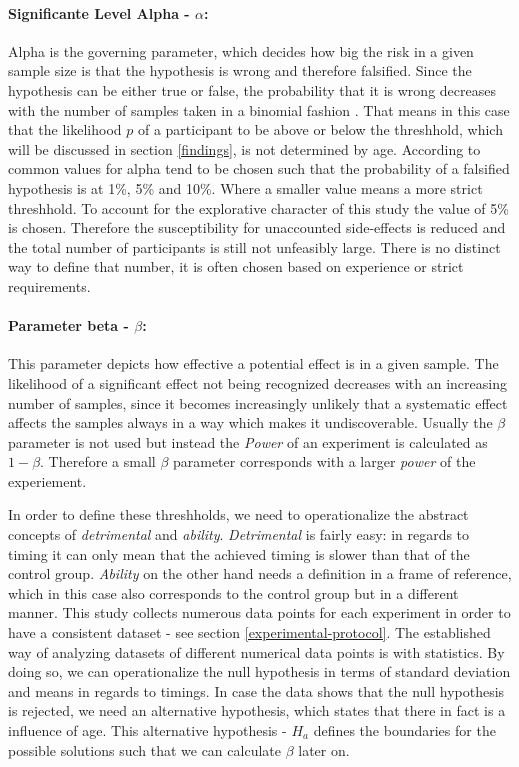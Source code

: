             \paragraph{Significante Level Alpha - $\alpha$:} Alpha is the governing parameter, which decides how big the risk in a given sample size is that the hypothesis is wrong and therefore falsified. Since the hypothesis can be either true or false, the probability that it is wrong decreases with the number of samples taken in a binomial fashion \cite[103]{Siebertz.2017}. That means in this case that the likelihood $p$ of a participant to be above or below the threshhold, which will be discussed in section \ref*{findings}, is not determined by age. According to \cite[110]{Siebertz.2017} common values for alpha tend to be chosen such that the probability of a falsified hypothesis is at 1\%, 5\% and 10\%. Where a smaller value means a more strict threshhold. To account for the explorative character of this study the value of 5\% is chosen. Therefore the susceptibility for unaccounted side-effects is reduced and the total number of participants is still not unfeasibly large. There is no distinct way to define that number, it is often chosen based on experience or strict requirements.
            
            \paragraph{Parameter beta - $\beta$:} This parameter depicts how effective a potential effect is in a given sample. The likelihood of a significant effect not being recognized decreases with an increasing number of samples, since it becomes increasingly unlikely that a systematic effect affects the samples always in a way which makes it undiscoverable. Usually the $\beta$ parameter is not used but instead the \textit{Power} of an experiment is calculated as $1-\beta$. Therefore a small $\beta$ parameter corresponds with a larger \textit{power} of the experiement.

            \medskip

            In order to define these threshholds, we need to operationalize the abstract concepts of \textit{detrimental} and \textit{ability}. \textit{Detrimental} is fairly easy: in regards to timing it can only mean that the achieved timing is slower than that of the control group. \textit{Ability} on the other hand needs a definition in a frame of reference, which in this case also corresponds to the control group but in a different manner. This study collects numerous data points for each experiment in order to have a consistent dataset - see section \ref{experimental-protocol}. The established way of analyzing datasets of different numerical data points is with statistics. By doing so, we can operationalize the null hypothesis in terms of standard deviation and means in regards to timings. In case the data shows that the null hypothesis is rejected, we need an alternative hypothesis, which states that there in fact is a influence of age. This alternative hypothesis - $H_{a}$ defines the boundaries for the possible solutions such that we can calculate $\beta$ later on.

